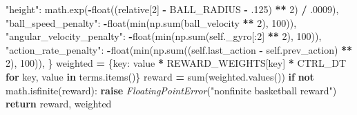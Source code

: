 \documentclass[
  chinese,
  11pt,
  letterpaper,
]{article}
\newenvironment{Shaded}{\begin{snugshade}}{\end{snugshade}}
\newcommand{\BuiltInTok}[1]{#1}
\newcommand{\ControlFlowTok}[1]{\textcolor[rgb]{0.13,0.29,0.53}{\textbf{#1}}}
\newcommand{\DecValTok}[1]{\textcolor[rgb]{0.00,0.00,0.81}{#1}}
\newcommand{\FloatTok}[1]{\textcolor[rgb]{0.00,0.00,0.81}{#1}}
\newcommand{\KeywordTok}[1]{\textcolor[rgb]{0.13,0.29,0.53}{\textbf{#1}}}
\newcommand{\NormalTok}[1]{#1}
\newcommand{\OperatorTok}[1]{\textcolor[rgb]{0.81,0.36,0.00}{\textbf{#1}}}
\newcommand{\PreprocessorTok}[1]{\textcolor[rgb]{0.56,0.35,0.01}{\textit{#1}}}
\newcommand{\StringTok}[1]{\textcolor[rgb]{0.31,0.60,0.02}{#1}}
\newcommand{\VariableTok}[1]{\textcolor[rgb]{0.00,0.00,0.00}{#1}}
\renewenvironment{Shaded}{\par\smallskip}{\par\smallskip}
\begin{document}
\begin{Shaded}
\begin{Highlighting}[]
            \StringTok{"height"}\NormalTok{: math.exp(}\OperatorTok{{-}}\BuiltInTok{float}\NormalTok{((relative[}\DecValTok{2}\NormalTok{] }\OperatorTok{{-}}\NormalTok{ BALL\_RADIUS }\OperatorTok{{-}} \FloatTok{.125}\NormalTok{) }\OperatorTok{**} \DecValTok{2}\NormalTok{) }\OperatorTok{/} \FloatTok{.0009}\NormalTok{),}
            \StringTok{"ball\_speed\_penalty"}\NormalTok{: }\OperatorTok{{-}}\BuiltInTok{float}\NormalTok{(}\BuiltInTok{min}\NormalTok{(np.}\BuiltInTok{sum}\NormalTok{(ball\_velocity }\OperatorTok{**} \DecValTok{2}\NormalTok{), }\DecValTok{100}\NormalTok{)),}
            \StringTok{"angular\_velocity\_penalty"}\NormalTok{: }\OperatorTok{{-}}\BuiltInTok{float}\NormalTok{(}\BuiltInTok{min}\NormalTok{(np.}\BuiltInTok{sum}\NormalTok{(}\VariableTok{self}\NormalTok{.\_gyro[:}\DecValTok{2}\NormalTok{] }\OperatorTok{**} \DecValTok{2}\NormalTok{), }\DecValTok{100}\NormalTok{)),}
            \StringTok{"action\_rate\_penalty"}\NormalTok{: }\OperatorTok{{-}}\BuiltInTok{float}\NormalTok{(}\BuiltInTok{min}\NormalTok{(np.}\BuiltInTok{sum}\NormalTok{((}\VariableTok{self}\NormalTok{.last\_action }\OperatorTok{{-}} \VariableTok{self}\NormalTok{.prev\_action) }\OperatorTok{**} \DecValTok{2}\NormalTok{), }\DecValTok{100}\NormalTok{)),}
\NormalTok{        \}}
\NormalTok{        weighted }\OperatorTok{=}\NormalTok{ \{key: value }\OperatorTok{*}\NormalTok{ REWARD\_WEIGHTS[key] }\OperatorTok{*}\NormalTok{ CTRL\_DT }\ControlFlowTok{for}\NormalTok{ key, value }\KeywordTok{in}\NormalTok{ terms.items()\}}
\NormalTok{        reward }\OperatorTok{=} \BuiltInTok{sum}\NormalTok{(weighted.values())}
        \ControlFlowTok{if} \KeywordTok{not}\NormalTok{ math.isfinite(reward):}
            \ControlFlowTok{raise} \PreprocessorTok{FloatingPointError}\NormalTok{(}\StringTok{"nonfinite basketball reward"}\NormalTok{)}
        \ControlFlowTok{return}\NormalTok{ reward, weighted}


\end{Highlighting}
\end{Shaded}
\end{document}
